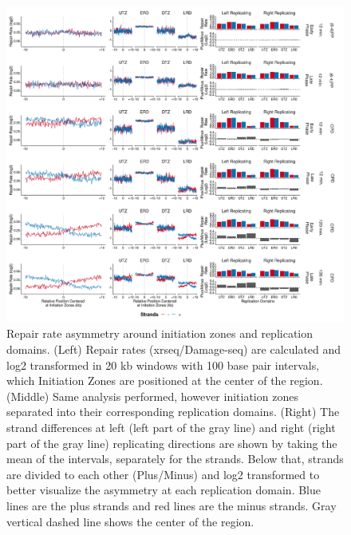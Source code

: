 \begin{figure}[H]
    \begin{center}
    \includegraphics[width=\textwidth]{Chapters/4_results/figures/fig6}
    \caption[Repair rate asymmetry around initiation zones and replication domains.]{Repair rate asymmetry around initiation zones and replication domains. (Left) Repair rates (\gls{xrseq}/Damage-seq) are calculated and log2 transformed in 20 kb windows with 100 base pair intervals, which Initiation Zones are positioned at the center of the region. (Middle) Same analysis performed, however initiation zones separated into their corresponding replication domains. (Right) The strand differences at left (left part of the gray line) and right (right part of the gray line) replicating directions are shown by taking the mean of the intervals, separately for the strands. Below that, strands are divided to each other (Plus/Minus) and log2 transformed to better visualize the asymmetry at each replication domain. Blue lines are the plus strands and red lines are the minus strands. Gray vertical dashed line shows the center of the region.}
    \label{fig:repairrate}
    \end{center}
    \end{figure}

                                                                   
